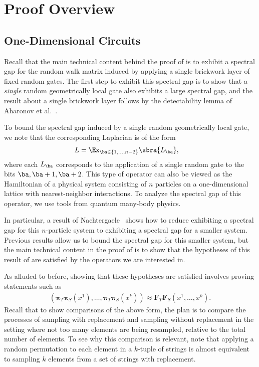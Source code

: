 \section{Proof Overview}\label{sec:overview}

\subsection{One-Dimensional Circuits}
Recall that the main technical content behind the proof of  is to exhibit a spectral gap for the random walk matrix induced by applying a single brickwork layer of fixed random gates. The first step to exhibit this spectral gap is to show that a \textit{single} random geometrically local gate also exhibits a large spectral gap, and the result about a single brickwork layer follows by the detectability lemma of Aharonov et al.~\cite{aharonov2009detectability}. 

To bound the spectral gap induced by a single random geometrically local gate, we note that the corresponding Laplacian is of the form 
\begin{align*}
    L &= \Ex_{\ba\in\{1,\dots,n-2\}}\sbra{L_{\ba}},
\end{align*}
where each $L_{\ba}$ corresponds to the application of a single random gate to the bits $\ba,\ba+1,\ba+2$. This type of operator can also be viewed as the Hamiltonian of a physical system consisting of $n$ particles on a one-dimensional lattice with nearest-neighbor interactions. To analyze the spectral gap of this operator, we use tools from quantum many-body physics.

In particular, a result of Nachtergaele~\cite{nachtergaele1996spectral} shows how to reduce exhibiting a spectral gap for this $n$-particle system to exhibiting a spectral gap for a smaller system. Previous results allow us to bound the spectral gap for this smaller system, but the main technical content in the proof of  is to show that the hypotheses of this result of \cite{nachtergaele1996spectral} are satisfied by the operators we are interested in.

As alluded to before, showing that these hypotheses are satisfied involves proving statements such as 
\begin{align*}
    (\bm{\pi}_T\bm{\pi}_S(x^1),\dots,\bm{\pi}_T\bm{\pi}_S(x^k)) \approx \bm{F}_T\bm{F}_S(x^1,\dots,x^k).
\end{align*}
Recall that to show comparisons of the above form, the plan is to compare the processes of sampling with replacement and sampling without replacement in the setting where not too many elements are being resampled, relative to the total number of elements. To see why this comparison is relevant, note that applying a random permutation to each element in a $k$-tuple of strings is almost equivalent to sampling $k$ elements from a set of strings with replacement. 

